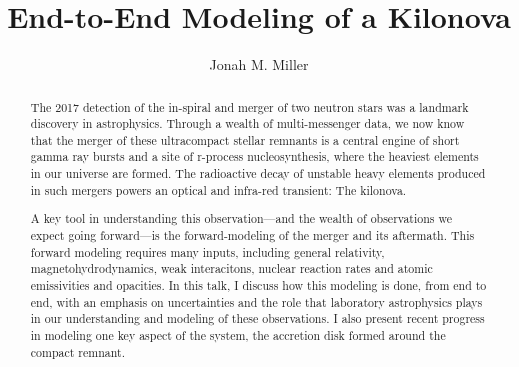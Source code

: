 \documentclass[letter,nofootinbib,superscriptaddress,twocolumn]{revtex4-1}
\begin{document}
\title{End-to-End Modeling of a Kilonova}

\author{Jonah M. Miller}

\begin{abstract}

  The 2017 detection of the in-spiral and merger of two neutron stars
  was a landmark discovery in astrophysics. Through a wealth of
  multi-messenger data, we now know that the merger of these
  ultracompact stellar remnants is a central engine of short gamma ray
  bursts and a site of r-process nucleosynthesis, where the heaviest
  elements in our universe are formed. The radioactive decay of
  unstable heavy elements produced in such mergers powers an optical
  and infra-red transient: The kilonova.

  A key tool in understanding this observation---and the wealth of
  observations we expect going forward---is the forward-modeling of
  the merger and its aftermath. This forward modeling requires many
  inputs, including general relativity, magnetohydrodynamics, weak
  interacitons, nuclear reaction rates and atomic emissivities and
  opacities. In this talk, I discuss how this modeling is done, from
  end to end, with an emphasis on uncertainties and the role that
  laboratory astrophysics plays in our understanding and modeling of
  these observations. I also present recent progress in modeling one
  key aspect of the system, the accretion disk formed around the
  compact remnant.

\end{abstract}

\maketitle
\end{document}

